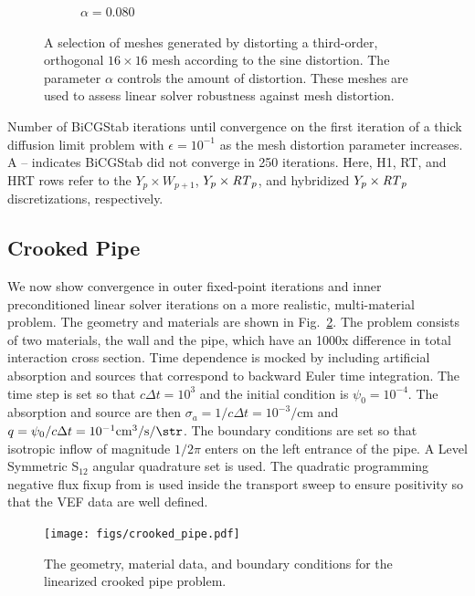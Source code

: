 \documentclass[../doc.tex]{subfiles}
\begin{document}
\begin{figure}
\begin{subfigure}{.24\textwidth}
	\caption{$\alpha = 0.080$}
\end{subfigure}
\caption{A selection of meshes generated by distorting a third-order, orthogonal $16\times 16$ mesh according to the sine distortion. The parameter $\alpha$ controls the amount of distortion. These meshes are used to assess linear solver robustness against mesh distortion. }
\label{rtvef:sine_meshes}
\end{figure}

\begin{table}
\centering
\caption{Number of BiCGStab iterations until convergence on the first iteration of a thick diffusion limit problem with $\epsilon = 10^{-1}$ as the mesh distortion parameter increases. A -- indicates BiCGStab did not converge in 250 iterations. Here, H1, RT, and HRT rows refer to the $Y_p\times W_{p+1}$, $Y_p\times \mathit{RT}_p$, and hybridized $Y_p\times \mathit{RT}_p$ discretizations, respectively.}
\label{rtvef:curved_solvers}

\end{table}

\subsection{Crooked Pipe} \label{rtvef_sec:cp}
We now show convergence in outer fixed-point iterations and inner preconditioned linear solver iterations on a more realistic, multi-material problem. The geometry and materials are shown in Fig.~\ref{rtvef:cp_diag}. The problem consists of two materials, the wall and the pipe, which have an 1000x difference in total interaction cross section. Time dependence is mocked by including artificial absorption and sources that correspond to backward Euler time integration. The time step is set so that $c\Delta t = 10^3$ and the initial condition is $\psi_0 = 10^{-4}$. The absorption and source are then $\sigma_a = 1/c\Delta t = 10^{-3} \si{\per\cm}$ and $q = \psi_0/c\Delta t = 10^{-1} \si{\per\cm\cubed\per\s\per\str}$. The boundary conditions are set so that isotropic inflow of magnitude $1/2\pi$ enters on the left entrance of the pipe. A Level Symmetric S$_{12}$ angular quadrature set is used. The quadratic programming negative flux fixup from \cite{YEE2020109696} is used inside the transport sweep to ensure positivity so that the VEF data are well defined. 
\begin{figure}
\centering
\texttt{[image: figs/crooked\_pipe.pdf]}
\caption{The geometry, material data, and boundary conditions for the linearized crooked pipe problem. }
\label{rtvef:cp_diag}
\end{figure}
\end{document}
